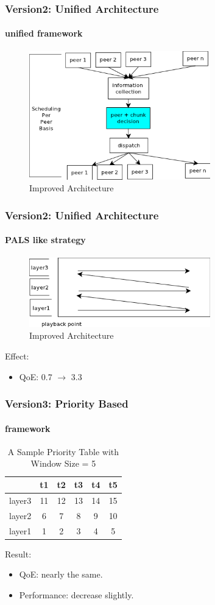 \documentclass[14pt]{beamer}
\begin{document}
\begin{frame}
\frametitle{Version2: Unified Architecture}
\framesubtitle{unified framework}
\begin{figure}
	\includegraphics[width=0.7\textwidth]{../fig/arch_improved.png}
	\caption{Improved Architecture}
\end{figure}
\end{frame}

\begin{frame}
\frametitle{Version2: Unified Architecture}
\framesubtitle{PALS like strategy}
\begin{figure}
	\includegraphics[width=0.7\textwidth]{../fig/pals_like.png}
	\caption{Improved Architecture}
\end{figure}
Effect:
\begin{itemize}
	\item QoE: 0.7 $\rightarrow$ 3.3
\end{itemize}
\end{frame}

\begin{frame}
\frametitle{Version3: Priority Based}
\framesubtitle{framework}
\begin{table}
\caption{A Sample Priority Table with Window Size = 5}
	\begin{tabular}{|c|ccccc|}
	\hline
	 & t1 & t2 & t3 & t4 & t5 \\
	 \hline
	layer3 & 11 & 12 & 13 & 14 & 15 \\
	layer2 & 6 & 7 & 8 & 9 & 10 \\
	layer1 & 1 & 2 & 3 & 4 & 5 \\
	\hline
	\end{tabular}
\end{table}

Result:
\begin{itemize}
	\item QoE: nearly the same. 
	\item Performance: decrease slightly. 
\end{itemize}
\end{frame}
\end{document}
